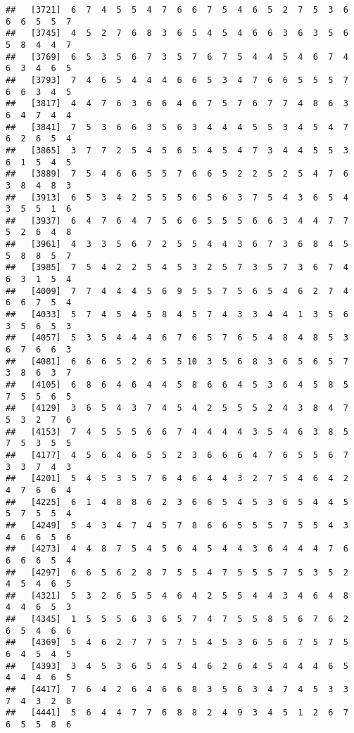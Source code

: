 \documentclass[
]{book}
\begin{document}
\begin{verbatim}
##   [3721]  6  7  4  5  5  4  7  6  6  7  5  4  6  5  2  7  5  3  6  6  6  5  5  7
##   [3745]  4  5  2  7  6  8  3  6  5  4  5  4  6  6  3  6  3  5  6  5  8  4  4  7
##   [3769]  6  5  3  5  6  7  3  5  7  6  7  5  4  4  5  4  6  7  4  6  3  4  6  5
##   [3793]  7  4  6  5  4  4  4  6  6  5  3  4  7  6  6  5  5  5  7  6  6  3  4  5
##   [3817]  4  4  7  6  3  6  6  4  6  7  5  7  6  7  7  4  8  6  3  6  4  7  4  4
##   [3841]  7  5  3  6  6  3  5  6  3  4  4  4  5  5  3  4  5  4  7  6  2  6  5  4
##   [3865]  3  7  7  2  5  4  5  6  5  4  5  4  7  3  4  4  5  5  3  6  1  5  4  5
##   [3889]  7  5  4  6  6  5  5  7  6  6  5  2  2  5  2  5  4  7  6  3  8  4  8  3
##   [3913]  6  5  3  4  2  5  5  5  6  5  6  3  7  5  4  3  6  5  4  3  5  5  1  6
##   [3937]  6  4  7  6  4  7  5  6  6  5  5  5  6  6  3  4  4  7  7  5  2  6  4  8
##   [3961]  4  3  3  5  6  7  2  5  5  4  4  3  6  7  3  6  8  4  5  5  8  8  5  7
##   [3985]  7  5  4  2  2  5  4  5  3  2  5  7  3  5  7  3  6  7  4  6  3  1  5  4
##   [4009]  7  7  4  4  4  5  6  9  5  5  7  5  6  5  4  6  2  7  4  6  6  7  5  4
##   [4033]  5  7  4  5  4  5  8  4  5  7  4  3  3  4  4  1  3  5  6  3  5  6  5  3
##   [4057]  5  3  5  4  4  4  6  7  6  5  7  6  5  4  8  4  8  5  3  6  7  6  6  3
##   [4081]  6  6  6  5  2  6  5  5 10  3  5  6  8  3  6  5  6  5  7  3  8  6  3  7
##   [4105]  6  8  6  4  6  4  4  5  8  6  6  4  5  3  6  4  5  8  5  7  5  5  6  5
##   [4129]  3  6  5  4  3  7  4  5  4  2  5  5  5  2  4  3  8  4  7  5  3  2  7  6
##   [4153]  7  4  5  5  5  6  6  7  4  4  4  4  3  5  4  6  3  8  5  7  5  3  5  5
##   [4177]  4  5  6  4  6  5  5  2  3  6  6  6  4  7  6  5  5  6  7  3  3  7  4  3
##   [4201]  5  4  5  3  5  7  6  4  6  4  4  3  2  7  5  4  6  4  2  4  7  6  6  4
##   [4225]  6  1  4  8  8  6  2  3  6  6  5  4  5  3  6  5  4  4  5  5  7  5  5  4
##   [4249]  5  4  3  4  7  4  5  7  8  6  6  5  5  5  7  5  5  4  3  4  6  6  5  6
##   [4273]  4  4  8  7  5  4  5  6  4  5  4  4  3  6  4  4  4  7  6  6  6  6  5  4
##   [4297]  6  6  5  6  2  8  7  5  5  4  7  5  5  5  7  5  3  5  2  4  5  4  6  5
##   [4321]  5  3  2  6  5  5  4  6  4  2  5  5  4  4  3  4  6  4  8  4  4  6  5  3
##   [4345]  1  5  5  5  6  3  6  5  7  4  7  5  5  8  5  6  7  6  2  6  5  4  6  6
##   [4369]  5  4  6  2  7  7  5  7  5  4  5  3  6  5  6  7  5  7  5  6  4  5  4  5
##   [4393]  3  4  5  3  6  5  4  5  4  6  2  6  4  5  4  4  4  6  5  4  4  4  6  5
##   [4417]  7  6  4  2  6  4  6  6  8  3  5  6  3  4  7  4  5  3  3  7  4  3  2  8
##   [4441]  5  6  4  4  7  7  6  8  8  2  4  9  3  4  5  1  2  6  7  6  5  5  8  6

\end{verbatim}
\end{document}
